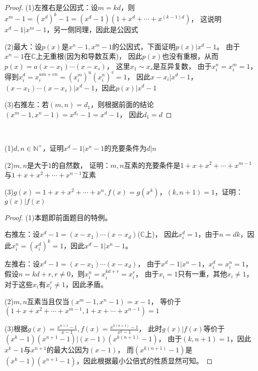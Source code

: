 \begin{proof}
  (1)左推右是公因式：设$m = kd$，则$x^m - 1 = (x^d)^k - 1 = (x^d - 1)(1 + x^d + \cdots + x^{(k-1)d})$，
  这说明$x^d - 1| x^m - 1$，另一侧同理，因此是公因式

  (2)最大：设$p(x)$是$x^n - 1, x^m - 1$的公因式，下面证明$p(x) | x^d - 1$。
  由于$x^n - 1$在$\mathbb{C}$上无重根(因为和导数互素)，
  因此$p(x)$也没有重根，从而$p(x) = a(x - x_1) \cdots (x - x_s)$，
  这里$x_1 \sim x_s$是互异复数，
  由于$x_i^n = x_i^m = 1$，得到$x_i^d = x_i^{um + vn} = (x_i^m)^u(x_i^n)^v = 1$，
  因此$x - x_i | x^d - 1$，
  $(x-x_1) \cdots (x - x_s) | x^d - 1$，因此$p(x) | x^d - 1$

  (3)右推左：若$(m,n) = d_1$，则根据前面的结论$(x^m - 1, x^n - 1) = x^{d_1} - 1 = x^d - 1$，
  因此$d_1 = d$
\end{proof}

~

\begin{exercise}[整除与多项式]
  (1)$d,n \in \mathbb{N}^+$，证明$x^d - 1| x^n - 1$的充要条件为$d | n$

  (2)$m,n$是大于$1$的自然数，
  证明：$m,n$互素的充要条件是$1 + x + x^2 + \cdots + x^{m-1}$与$1 + x + x^2 + \cdots + x^{n-1}$互素

  (3)$g(x) = 1 + x + x^2 + \cdots + x^n, f(x) = g(x^k)$，$(k,n+1) = 1$，证明：$g(x) | f(x)$

\end{exercise}

\begin{proof}
  (1)本题即前面题目的特例。

  右推左：设$x^d - 1 = (x - x_1)\cdots(x - x_d)$($\mathbb{C}$上)，
  因此$x_i^d = 1$，由于$n = dk$，因此$x_i^n = (x_i^d)^k = 1$，因此$x^d - 1 | x^n - 1$。

  左推右：设$x^d - 1 = (x - x_1) \cdots (x - x_d)$，
  由于$x^d - 1 | x^n - 1$，$x_i^d = x_i^n = 1$，
  假设$n = kd + r, r \neq 0$，则$x_i^n = x_i^{kd + r} = x_i^r$，
  由于$x_i = 1$只有一重，其他$x_i \neq 1$，
  对于这些$x_i$有$x_i^r \neq 1$，因此矛盾。

  (2)$m,n$互素当且仅当$(x^m - 1, x^n - 1) = x - 1$，
  等价于$(1 + x + x^2 + \cdots + x^{m-1}, 1 + x + \cdots + x^{n-1}) = 1$

  (3)根据$g(x) = \frac{x^{n+1} - 1}{x - 1}, f(x) = \frac{x^{k(n+1)} - 1}{x^k - 1}$，
  此时$g(x)|f(x)$等价于$(x^k - 1)(x^{n+1} - 1)| (x - 1)(x^{k(n+1)}-1)$，
  由于$(k,n+1) = 1$，因此$x^k - 1$与$x^{n+1}$的最大公因为$(x - 1)$，
  而$(x^{k(n+1)} - 1)$是$(x^k - 1)(x^{n+1} - 1)$，因此根据最小公倍式的性质显然可知。
\end{proof}


